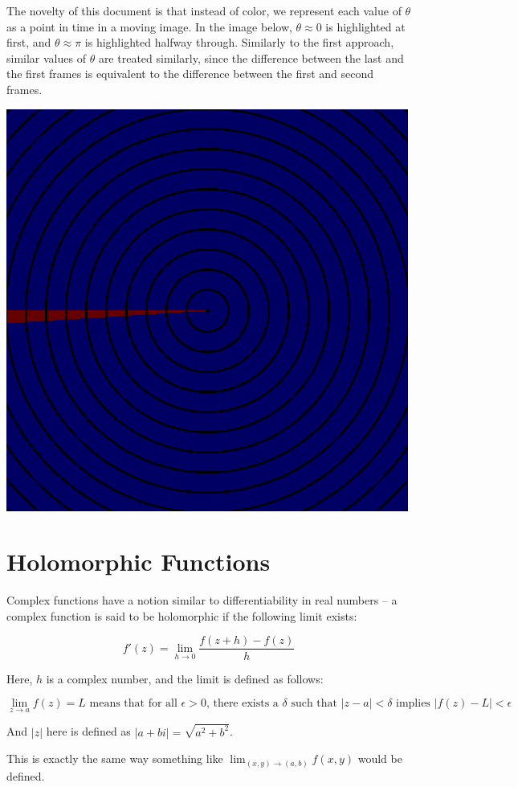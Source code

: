 \documentclass[xhtml, mathjax]{article}
\begin{document}
  The novelty of this document is that instead of color, we represent each value
  of $\theta$ as a point in time in a moving image. In the image below, $\theta \approx 0$ is
  highlighted at first, and $\theta \approx \pi$ is highlighted halfway
  through. Similarly to the first approach, similar values of $\theta$ are
  treated similarly, since the difference between the last and the first frames
  is equivalent to the difference between the first and second frames.
  \begin{center}
    \includegraphics{z_loop.gif}
  \end{center}

  \section{Holomorphic Functions}

  Complex functions have a notion similar to differentiability in real numbers
  -- a complex function is said to be holomorphic if the following limit exists:

  \[f'(z) = \lim_{h \to 0} \frac{f(z+h) - f(z)}{h}\]

  Here, $h$ is a complex number, and the limit is defined as follows:

  \[\lim_{z \to a}f(z) = L \text{ means that for all } \epsilon > 0 \text{,
  there exists a } \delta \text{ such that } |z - a| < \delta \text{ implies }
  |f(z) - L| < \epsilon\]

  And $|z|$ here is defined as $|a+bi| = \sqrt{a^2+b^2}$.

  This is exactly the same way something like $\lim_{(x,y) \to (a,b)} f(x,y)$
  would be defined.
\end{document}

